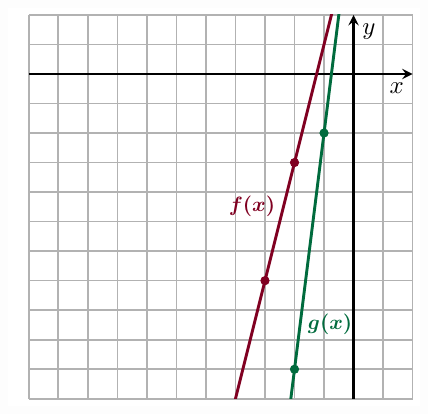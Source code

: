 \documentclass[10pt, a4paper]{article}
\begin{document}
\begin{enumerate}
\begin{minipage}[t]{0.6\textwidth}
	\end{minipage}
	\begin{minipage}[t]{0.3\textwidth}
		\includegraphics[align=t, width=\textwidth]{../graphs/graph_5/graph_5}
	\end{minipage}
\end{enumerate}
\end{document}
